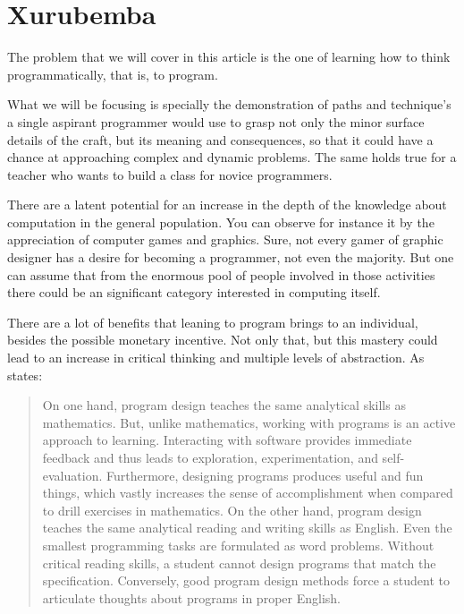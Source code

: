 \section{Xurubemba}
The problem that we will cover in this article is the one of learning how to
think programmatically, that is, to program.

What we will be focusing is specially the demonstration of paths and technique's
a single aspirant programmer would use to grasp not only the minor surface
details of the craft, but its meaning and consequences, so that it could have a
chance at approaching complex and dynamic problems. The same holds true for a
teacher who wants to build a class for novice programmers.

There are a latent potential for an increase in the depth of the knowledge about
computation in the general population. You can observe for instance it by the
appreciation of computer games and graphics. Sure, not every gamer of graphic
designer has a desire for becoming a programmer, not even the majority. But one
can assume that from the enormous pool of people involved in those activities
there could be an significant category interested in computing itself.

There are a lot of benefits that leaning to program brings to an individual,
besides the possible monetary incentive. \cite{education:sussman__why_programming_is_a_good_medium}
Not only that, but this mastery could lead to an increase in critical thinking
and multiple levels of abstraction. As \cite{education:felleisen__htdp} states:

\begin{quotation}
    On one hand, program design teaches the same analytical skills as mathematics.
    But, unlike mathematics, working with programs is an active approach to
    learning. Interacting with software provides immediate feedback and thus leads
    to exploration, experimentation, and self-evaluation. Furthermore, designing
    programs produces useful and fun things, which vastly increases the sense of
    accomplishment when compared to drill exercises in mathematics. On the other
    hand, program design teaches the same analytical reading and writing skills as
    English. Even the smallest programming tasks are formulated as word problems.
    Without critical reading skills, a student cannot design programs that match the
    specification. Conversely, good program design methods force a student to
    articulate thoughts about programs in proper English.
\end{quotation}

